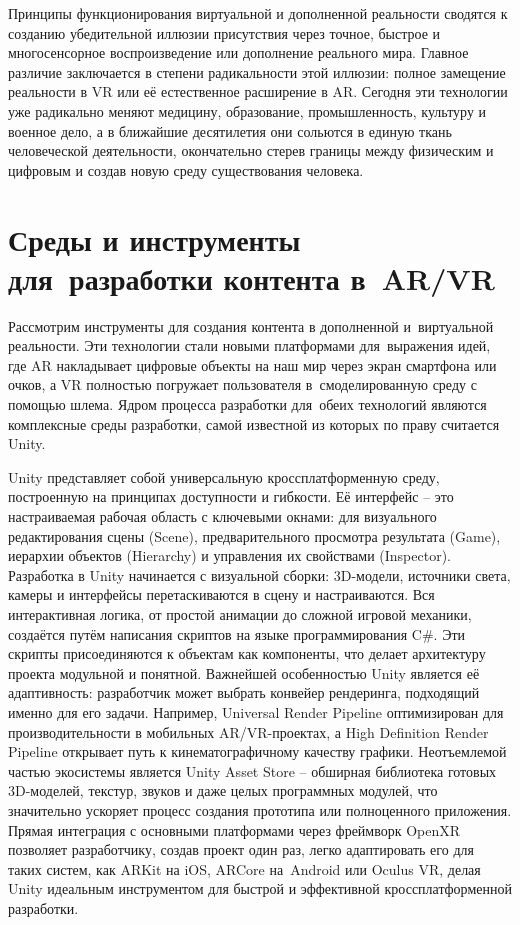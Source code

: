 \documentclass{ou}
\begin{document}
Принципы функционирования виртуальной и дополненной реальности сводятся к созданию убедительной иллюзии присутствия через точное, быстрое и многосенсорное воспроизведение или дополнение реального мира. Главное различие заключается в степени радикальности этой иллюзии: полное замещение реальности в VR или её естественное расширение в AR. Сегодня эти технологии уже радикально меняют медицину, образование, промышленность, культуру и военное дело, а в ближайшие десятилетия они сольются в единую ткань человеческой деятельности, окончательно стерев границы между физическим и цифровым и создав новую среду существования человека.
\newpage
\section{Среды и инструменты для~разработки контента в~AR/VR}
Рассмотрим инструменты для создания контента в дополненной и~виртуальной реальности. Эти технологии стали новыми платформами для~выражения идей, где AR накладывает цифровые объекты на наш мир через экран смартфона или очков, а VR полностью погружает пользователя в~смоделированную среду с помощью шлема. Ядром процесса разработки для~обеих технологий являются комплексные среды разработки, самой известной из которых по праву считается Unity.

Unity представляет собой универсальную кроссплатформенную среду, построенную на принципах доступности и гибкости. Её интерфейс -- это настраиваемая рабочая область с ключевыми окнами: для визуального редактирования сцены (Scene), предварительного просмотра результата (Game), иерархии объектов (Hierarchy) и управления их свойствами (Inspector). Разработка в Unity начинается с визуальной сборки: 3D-модели, источники света, камеры и интерфейсы перетаскиваются в сцену и настраиваются. Вся интерактивная логика, от простой анимации до сложной игровой механики, создаётся путём написания скриптов на языке программирования C\#. Эти скрипты присоединяются к объектам как компоненты, что делает архитектуру проекта модульной и понятной. Важнейшей особенностью Unity является её адаптивность: разработчик может выбрать конвейер рендеринга, подходящий именно для его задачи. Например, Universal Render Pipeline оптимизирован для производительности в мобильных AR/VR-проектах, а High Definition Render Pipeline открывает путь к кинематографичному качеству графики. Неотъемлемой частью экосистемы является Unity Asset Store -- обширная библиотека готовых 3D-моделей, текстур, звуков и даже целых программных модулей, что значительно ускоряет процесс создания прототипа или полноценного приложения. Прямая интеграция с основными платформами через фреймворк OpenXR позволяет разработчику, создав проект один раз, легко адаптировать его для таких систем, как ARKit на iOS, ARCore на~Android или Oculus VR, делая Unity идеальным инструментом для быстрой и эффективной кроссплатформенной разработки.
\end{document}
